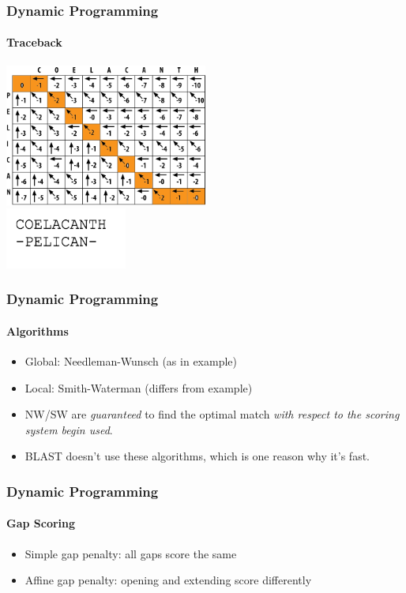 \documentclass[table]{beamer}
\begin{document}
    \begin{frame}
     \frametitle{Dynamic Programming}
     \framesubtitle{Traceback}
       \begin{center}
         \includegraphics[width=0.5\textwidth]{images/traceback} \\
         \includegraphics[width=0.3\textwidth]{images/traceback_sequence}         
       \end{center}
    \end{frame}     

    \begin{frame}
     \frametitle{Dynamic Programming}
     \framesubtitle{Algorithms}
       \begin{itemize}
         \item<1-> Global: Needleman-Wunsch (as in example)
         \item<1-> Local: Smith-Waterman (differs from example)
         \item<2-> NW/SW are \emph{guaranteed} to find the optimal match \emph{with respect to the scoring system begin used}.
         \item<3-> BLAST doesn't use these algorithms, which is one reason why it's fast.
       \end{itemize}
    \end{frame}   

    \begin{frame}
     \frametitle{Dynamic Programming}
     \framesubtitle{Gap Scoring}
       \begin{itemize}
         \item Simple gap penalty: all gaps score the same
         \item Affine gap penalty: opening and extending score differently
       \end{itemize}
    \end{frame}  
   
\end{document}
